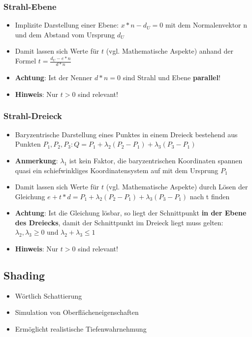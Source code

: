 \subsubsection{Strahl-Ebene}%
\label{rt:ssub:strahl_ebene}

\begin{itemize}
	\item Implizite Darstellung einer Ebene: $x * n - d_U = 0$ mit dem Normalenvektor n und dem Abstand vom Ursprung $d_U$
	\item Damit lassen sich Werte für $t$ (vgl. Mathematische Aspekte) anhand der Formel $t = \frac{d_U - e * n}{d * n}$
	\item \textbf{Achtung}: Ist der Nenner $d * n = 0$ sind Strahl und Ebene \textbf{parallel}!
	\item \textbf{Hinweis}: Nur $t > 0$ sind relevant!
\end{itemize}

\subsubsection{Strahl-Dreieck}%
\label{rt:ssub:strahl_dreieck}

\begin{itemize}
	\item Baryzentrische Darstellung eines Punktes in einem Dreieck bestehend aus Punkten $P_1, P_2, P_3: Q = P_1 + \lambda_2(P_2 - P_1) + \lambda_3(P_3 - P_1)$
	\item \textbf{Anmerkung}: $\lambda_1$ ist kein Faktor, die baryzentrischen Koordinaten spannen quasi ein schiefwinkliges Koordinatensystem auf mit dem Ursprung $P_1$
	\item Damit lassen sich Werte für $t$ (vgl. Mathematische Aspekte) durch Lösen der Gleichung $e + t * d = P_1 + \lambda_2(P_2 - P_1) + \lambda_3(P_3 - P_1)$ nach t finden
	\item \textbf{Achtung}: Ist die Gleichung lösbar, so liegt der Schnittpunkt \textbf{in der Ebene des Dreiecks}, damit der Schnittpunkt im Dreieck liegt muss gelten: $\lambda_2, \lambda_3 \geq 0$ und $\lambda_2 + \lambda_3 \leq 1$
	\item \textbf{Hinweis}: Nur $t > 0$ sind relevant!
\end{itemize}

\subsection{Shading}%
\label{rt:sub:shading}

\begin{itemize}
	\item Wörtlich \glqq Schattierung\grqq
	\item Simulation von Oberflächeneigenschaften
	\item Ermöglicht realistische Tiefenwahrnehmung
\end{itemize}

